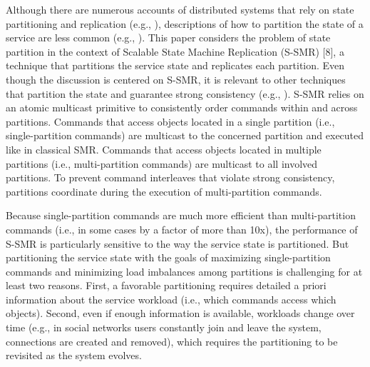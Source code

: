 Although there are numerous accounts of distributed systems that rely on state partitioning and replication (e.g., \cite{x,y,z,w}), descriptions of how to partition the state of a service are less common (e.g., \cite{curino2010sch}).
This paper considers the problem of state partition in the context of Scalable State Machine Replication (S-SMR) [8], a technique that partitions the service state and replicates each partition.
Even though the discussion is centered on S-SMR, it is relevant to other techniques that partition the state and guarantee strong consistency (e.g., \cite{xxx}).
%
%
S-SMR relies on an atomic multicast primitive to consistently order commands within and across partitions. 
Commands that access objects located in a single partition (i.e., single-partition commands) are multicast to the concerned partition and executed like in classical SMR. 
Commands that access objects located in multiple partitions (i.e., multi-partition commands) are multicast to all involved partitions.
To prevent command interleaves that violate strong consistency, partitions coordinate during the execution of multi-partition commands.

Because single-partition commands are much more efficient than multi-partition commands (i.e., in some cases by a factor of more than 10x), the performance of S-SMR is particularly sensitive to the way the service state is partitioned.
But partitioning the service state with the goals of maximizing single-partition commands and minimizing load imbalances among partitions is challenging for at least two reasons.
First, a favorable partitioning requires detailed a priori information about the service workload (i.e., which commands access which objects).
Second, even if enough information is available, workloads change over time (e.g., in social networks users constantly join and leave the system, connections are created and removed), which requires the partitioning to be revisited as the system evolves.

